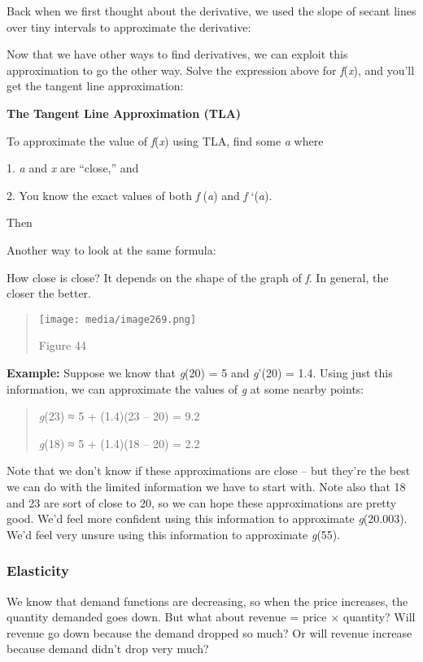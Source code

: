 Back when we first thought about the derivative, we used the slope of
secant lines over tiny intervals to approximate the derivative:

Now that we have other ways to find derivatives, we can exploit this
approximation to go the other way. Solve the expression above for
\emph{f}(\emph{x}), and you'll get the tangent line approximation:

\textbf{The Tangent Line Approximation (TLA)}

To approximate the value of \emph{f}(\emph{x}) using TLA, find some
\emph{a} where

1. \emph{a} and \emph{x} are ``close,'' and

2. You know the exact values of both \emph{f} (\emph{a}) and \emph{f}
`(\emph{a}).

Then

Another way to look at the same formula:

How close is close? It depends on the shape of the graph of \emph{f}. In
general, the closer the better.

\begin{quote}
\texttt{[image: media/image269.png]}

Figure 44
\end{quote}

\textbf{Example:} Suppose we know that \emph{g}(20) = 5 and
\emph{g}'(20) = 1.4. Using just this information, we can approximate the
values of \emph{g} at some nearby points:

\begin{quote}
\emph{g}(23) ≈ 5 + (1.4)(23 -- 20) = 9.2

\emph{g}(18) ≈ 5 + (1.4)(18 -- 20) = 2.2
\end{quote}

Note that we don't know if these approximations are close -- but they're
the best we can do with the limited information we have to start with.
Note also that 18 and 23 are sort of close to 20, so we can hope these
approximations are pretty good. We'd feel more confident using this
information to approximate \emph{g}(20.003). We'd feel very unsure using
this information to approximate \emph{g}(55).

\subsubsection{Elasticity}\label{elasticity}

We know that demand functions are decreasing, so when the price
increases, the quantity demanded goes down. But what about revenue =
price × quantity? Will revenue go down because the demand dropped so
much? Or will revenue increase because demand didn't drop very much?

